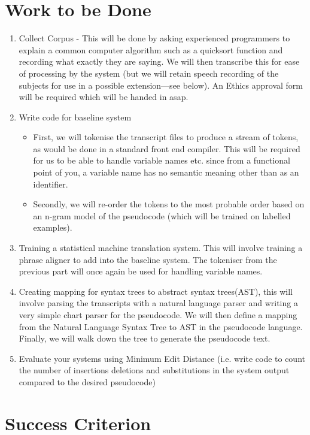 \documentclass[12pt]{article}
\begin{document}
\section*{Work to be Done}
\begin{enumerate}
\item Collect Corpus - This will be done by asking experienced programmers to explain a common computer algorithm such as a quicksort function and recording what exactly they are 
saying. We will then transcribe this for ease of processing by the system (but we will retain speech recording of the subjects for use in a possible extension—see below).
 An Ethics approval form will be required which will be handed in asap.
\item Write code for baseline system
\begin{itemize}
\item First, we will tokenise the transcript files to produce a stream of tokens, as would be done in a standard front end compiler. This will be required for us to be able to 
handle variable names etc. since from a functional point of you, a variable name has no semantic meaning other than as an identifier.
\item Secondly, we will re-order the tokens to the most probable order based on an n-gram model of the pseudocode (which will be trained on labelled examples).
\end{itemize}
\item Training a statistical machine translation system. This will involve training a phrase aligner to add into the baseline system. The tokeniser from the previous part will once again be used for handling variable names.
\item Creating mapping for syntax trees to abstract syntax trees(AST), this will involve parsing the transcripts with a natural language parser and writing a very simple chart parser for
the pseudocode. We will then define a mapping from the Natural Language Syntax Tree to AST in the pseudocode language. Finally, we will walk down the tree to generate the pseudocode text.
\item Evaluate your systems using Minimum Edit Distance (i.e. write code to count the number of insertions deletions and substitutions in the system output compared to the desired pseudocode)
\end{enumerate}

\section*{Success Criterion}
\end{document}
